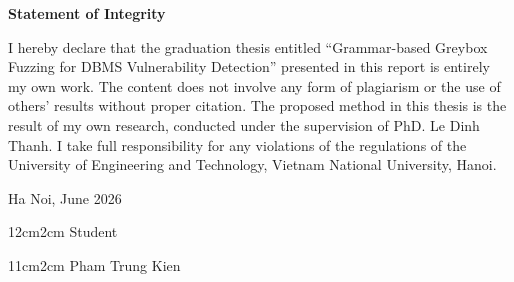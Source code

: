 \setcounter{page}{1}
\begin{center}
\textbf{\large{Statement of Integrity}}
\end{center}

I hereby declare that the graduation thesis entitled ``Grammar-based Greybox Fuzzing for DBMS Vulnerability Detection'' presented in this report is entirely my own work. The content does not involve any form of plagiarism or the use of others' results without proper citation. The proposed method in this thesis is the result of my own research, conducted under the supervision of PhD. Le Dinh Thanh. I take full responsibility for any violations of the regulations of the University of Engineering and Technology, Vietnam National University, Hanoi.

\begin{flushright}
Ha Noi, June 2026
\end{flushright}

\begin{changemargin}{12cm}{2cm}
Student
\\[2cm]
\end{changemargin}

\begin{changemargin}{11cm}{2cm}
Pham Trung Kien
\end{changemargin}

